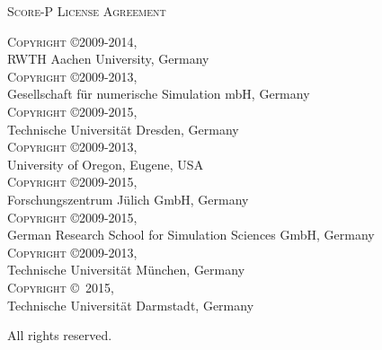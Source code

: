 \begin{center}
  \textsc{\LARGE Score-P License Agreement}
\end{center}

\textsc{Copyright \copyright 2009-2014,} \\
\hspace*{10mm}RWTH Aachen University, Germany \\
\textsc{Copyright \copyright 2009-2013,} \\
\hspace*{10mm}Gesellschaft f{\"u}r numerische Simulation mbH, Germany \\
\textsc{Copyright \copyright 2009-2015,} \\
\hspace*{10mm}Technische Universit{\"a}t Dresden, Germany \\
\textsc{Copyright \copyright 2009-2013,} \\
\hspace*{10mm}University of Oregon, Eugene, USA \\
\textsc{Copyright \copyright 2009-2015,} \\
\hspace*{10mm}Forschungszentrum J{\"u}lich GmbH, Germany \\
\textsc{Copyright \copyright 2009-2015,} \\
\hspace*{10mm}German Research School for Simulation Sciences GmbH, Germany \\
\textsc{Copyright \copyright 2009-2013,} \\
\hspace*{10mm}Technische Universit{\"a}t M{\"u}nchen, Germany \\
\textsc{Copyright \copyright\, 2015,} \\
\hspace*{10mm}Technische Universit{\"a}t Darmstadt, Germany

All rights reserved.
\vfill

